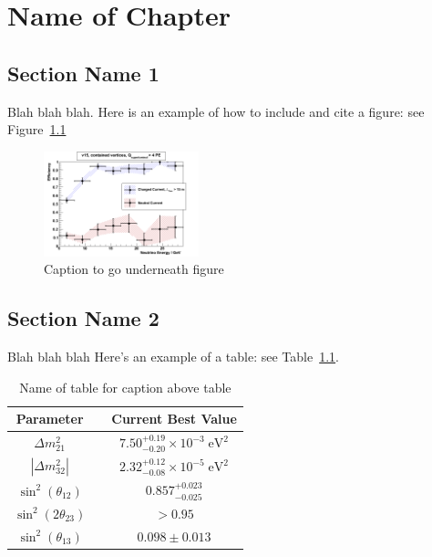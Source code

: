 \chapter{Name of Chapter}
\newpage

\section{Section Name 1}
Blah blah blah. Here is an example of how to include and cite a figure: see Figure~\ref{fig:example_figure}
\begin{figure}[H]
\center\includegraphics[width=0.4\textwidth]{figures/ExampleFigure.png}
\caption[Caption to go in list of figures]{Caption to go underneath figure}
\label{fig:example_figure}
\end{figure}

\section{Section Name 2}
Blah blah blah Here's an example of a table: see Table~\ref{tab:best_values}.

\begin{table}[H]
\centering\onehalfspacing
\vline
\begin{tabular}{c c c}
\hline
\textbf{Parameter} & \vline & \textbf{Current Best Value}\\
\hline
$\Delta m^2_{21}$ & \vline & $7.50^{+0.19}_{-0.20} \times 10^{-3}\;\mathrm{eV}^2$\\
$|\Delta m^2_{32}|$ & \vline & $2.32^{+0.12}_{-0.08} \times 10^{-5}\;\mathrm{eV}^2$\\
$\sin^2{(\theta_{12})}$ & \vline & $0.857^{+0.023}_{-0.025}$\\
$\sin^2{(2\theta_{23})}$ & \vline & $>0.95$\\
$\sin^2{(\theta_{13})}$ & \vline &  $0.098\pm 0.013$\\
\hline\end{tabular}\vline
\captionsetup{width=0.86\textwidth}
\caption[Name of table for list of tables]{Name of table for caption above table}
\label{tab:best_values}
\end{table}

